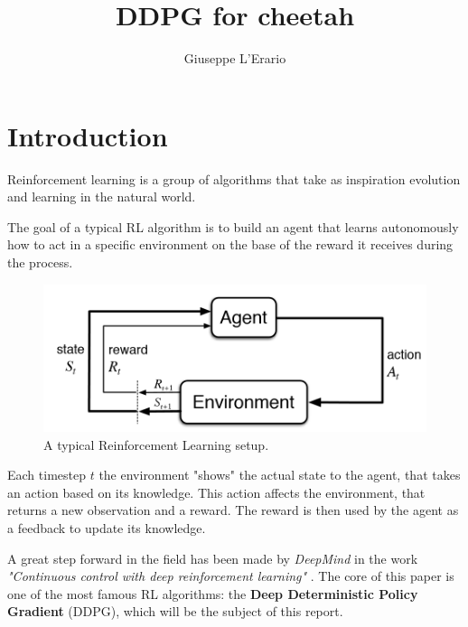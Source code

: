 \documentclass[10pt,a4paper]{scrartcl}
\author{Giuseppe L'Erario}
\date{}
\title{DDPG for cheetah}
\begin{document}


\tableofcontents

\clearpage

\section{Introduction}

Reinforcement learning is a group of algorithms that take as inspiration evolution and learning in the natural world. 

The goal of a typical RL algorithm is to build an agent that learns autonomously how to act in a specific environment on the base of the reward it receives during the process.

\begin{figure}[h]
	\centering
	\includegraphics[width=0.7\linewidth]{images/rl}
	\caption{A typical Reinforcement Learning setup.}
	\label{fig:rl}
\end{figure}

Each timestep $ t $ the environment "shows" the actual state to the agent, that takes an action based on its knowledge. This action affects the environment, that returns a new observation and a reward. The reward is then used by the agent as a feedback to update its knowledge.

A great step forward in the field has been made by \textit{DeepMind} in the work \textit{"Continuous control with deep reinforcement learning"} \cite{lillicrap2015continuous}. The core of this paper is one of the most famous RL algorithms: the \textbf{Deep Deterministic Policy Gradient} (DDPG), which will be the subject of this report.

  
\end{document}
